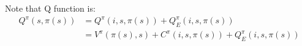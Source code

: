 
Note that Q function is:
\begin{align}
    Q^{\pi}(s, \pi(s)) &= Q^{\pi}(i, s, \pi(s)) + Q_E^{\pi}(i, s, \pi(s))\\
    &= V^{\pi}(\pi(s), s) + C^{\pi}(i, s, \pi(s)) + Q_E^{\pi}(i, s, \pi(s))
\end{align}


